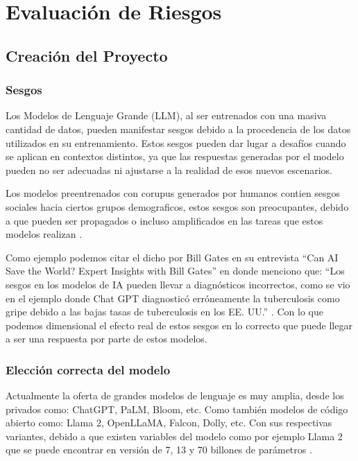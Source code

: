 
\chapter{Evaluación de Riesgos}

\section{Creación del Proyecto}

\subsection{Sesgos} %

Los Modelos de Lenguaje Grande (LLM), al ser entrenados con una masiva cantidad de datos, pueden manifestar sesgos debido a 
la procedencia de los datos utilizados en su entrenamiento. Estos sesgos pueden dar lugar a desafíos cuando se aplican en 
contextos distintos, ya que las respuestas generadas por el modelo pueden no ser adecuadas ni ajustarse a la realidad de 
esos nuevos escenarios.

Los modelos preentrenados con corupus generados por humanos contien sesgos sociales hacia ciertos grupos demograficos, estos
sesgos son preocupantes, debido a que pueden ser propagados o incluso amplificados en las tareas que estos modelos realizan \cite{sesgo2}.

Como ejemplo podemos citar el dicho por Bill Gates en su entrevista ``Can AI Save the World? Expert Insights with Bill Gates''  en donde menciono que: 
``Los sesgos en los modelos de IA pueden llevar a diagnósticos incorrectos, como se vio en el ejemplo donde Chat GPT diagnosticó erróneamente la 
tuberculosis como gripe debido a las bajas tasas de tuberculosis en los EE. UU.'' \cite{billgates1}. Con lo que podemos dimensional el efecto real de estos sesgos 
en lo correcto que puede llegar a ser una respuesta por parte de estos modelos.

\subsection{Elección correcta del modelo}
Actualmente la oferta de grandes modelos de lenguaje es muy amplia, desde los privados como: ChatGPT, PaLM, Bloom, etc. 
Como también modelos de código abierto como: Llama 2, OpenLLaMA, Falcon, Dolly, etc. \cite{modelo2} Con sus respectivas variantes, debido a que existen 
variables del modelo como por ejemplo Llama 2 que se puede encontrar en versión de 7, 13 y 70 billones de parámetros \cite{modelos3}. 

